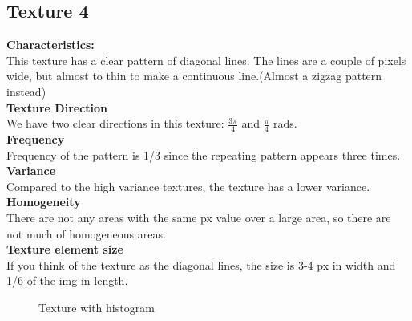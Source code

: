 \documentclass{article}
\begin{document}
\subsection{Texture 4}
\textbf{Characteristics:}\\
This texture has a clear pattern of diagonal lines. The lines are a couple of pixels wide, but almost to thin to make a continuous line.(Almost a zigzag pattern instead)  
\\

\textbf{Texture Direction}\\
We have two clear directions in this texture: $\frac{3\pi}{4}$ and $\frac{\pi}{4}$ rads.
\\ 
 
\textbf{Frequency} \\
Frequency of the pattern is 1/3 since the repeating pattern appears three times. 
\\

\textbf{Variance}\\
Compared to the high variance textures, the texture has a lower variance.
\\

\textbf{Homogeneity}\\
There are not any areas with the same px value over a large area, so there are not much of homogeneous areas.  
\\

\textbf{Texture element size}\\
If you think of the texture as the diagonal lines, the size is 3-4 px in width  and 1/6 of the img in length.
\\

\begin{figure}[h]%
	\centering
    \qquad
    \caption{Texture with histogram}%
    \label{fig:IMG4}%
\end{figure}
\end{document}
